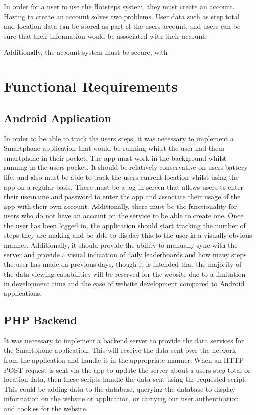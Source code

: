 \documentclass{l4proj}
\begin{document}
In order for a user to use the Hotsteps system, they must create an account. Having to create an account solves two problems. User data such as step total and location data can be stored as part of the users account, and users can be sure that their information would be associated with their account.

Additionally, the account system must be secure, with 

\section{Functional Requirements}

\subsection{Android Application}

In order to be able to track the users steps, it was necessary to implement a Smartphone application that would be running whilst the user had theur smartphone in their pocket. The app must work in the background whilst running in the users pocket. It should be relatively conservative on users battery life, and also must be able to track the users current location whilst using the app on a regular basis. There must be a log in screen that allows users to enter their username and password to enter the app and associate their usage of the app with their own account. Additionally, there must be the functionality for users who do not have an account on the service to be able to create one. Once the user has been logged in, the application should start tracking the number of steps they are making and be able to display this to the user in a visually obvious manner. Additionally, it should provide the ability to manually sync with the server and provide a visual indication of daily leaderboards and how many steps the user has made on previous days, though it is intended that the majority of the data viewing capabilities will be reserved for the website due to a limitation in development time and the ease of website development compared to Android applications.

\subsection{PHP Backend}

It was necessary to implement a backend server to provide the data services for the Smartphone application. This will receive the data sent over the network from the application and handle it in the appropriate manner. When an HTTP POST request is sent via the app to update the server about a users step total or location data, then these scripts handle the data sent using the requested script. This could be adding data to the database, querying the database to display information on the website or application, or carrying out user authentication and cookies for the website.
\end{document}

